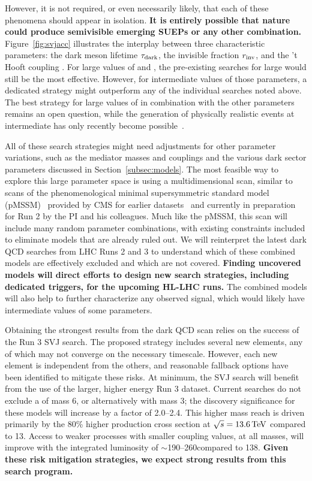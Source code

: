 However, it is not required, or even necessarily likely, that each of these phenomena should appear in isolation.
\textbf{It is entirely possible that nature could produce semivisible emerging SUEPs or any other combination.}
Figure~\ref{fig:svjacc} illustrates the interplay between three characteristic parameters:
the dark meson lifetime $\tau_\text{dark}$, the invisible fraction $r_{\mathrm{inv}}$, and the 't Hooft coupling \thooft.
For large values of \rinv and \taudark, the pre-existing searches for large \met would still be the most effective.
However, for intermediate values of those parameters, a dedicated strategy might outperform any of the individual searches noted above.
The best strategy for large values of \thooft in combination with the other parameters remains an open question,
while the generation of physically realistic events at intermediate \thooft has only recently become possible~\cite{Cesarotti:2020uod}.

All of these search strategies might need adjustments for other parameter variations,
such as the mediator masses and couplings and the various dark sector parameters discussed in Section~\ref{subsec:models}.
The most feasible way to explore this large parameter space is using a multidimensional scan,
similar to scans of the phenomenological minimal supersymmetric standard model (pMSSM)~\cite{Djouadi:1998di}
provided by CMS for earlier datasets~\cite{Khachatryan:2016nvf,SUS-16-033-supp} and currently in preparation for Run 2 by the PI and his colleagues.
Much like the pMSSM, this scan will include many random parameter combinations, with existing constraints included to eliminate models that are already ruled out.
We will reinterpret the latest dark QCD searches from LHC Runs 2 and 3 to understand which of these combined models are effectively excluded and which are not covered.
\textbf{Finding uncovered models will direct efforts to design new search strategies, including dedicated triggers, for the upcoming HL-LHC runs.}
The combined models will also help to further characterize any observed signal, which would likely have intermediate values of some parameters.

Obtaining the strongest results from the dark QCD scan relies on the success of the Run 3 SVJ search.
The proposed strategy includes several new elements, any of which may not converge on the necessary timescale.
However, each new element is independent from the others, and reasonable fallback options have been identified to mitigate these risks.
At minimum, the SVJ search will benefit from the use of the larger, higher energy Run 3 dataset.
Current searches do not exclude a \PZprime of mass 6\TeV, or alternatively \Pbifun with mass 3\TeV;
the discovery significance for these models will increase by a factor of 2.0--2.4.
This higher mass reach is driven primarily by the 80\% higher production cross section at $\sqrt{s}=13.6\,\text{Te\hspace{-.08em}V}$ compared to 13\TeV.
Access to weaker processes with smaller coupling values, at all masses, will improve with the integrated luminosity of ${\sim}$190--260\fbinv compared to 138\fbinv.
\textbf{Given these risk mitigation strategies, we expect strong results from this search program.}
